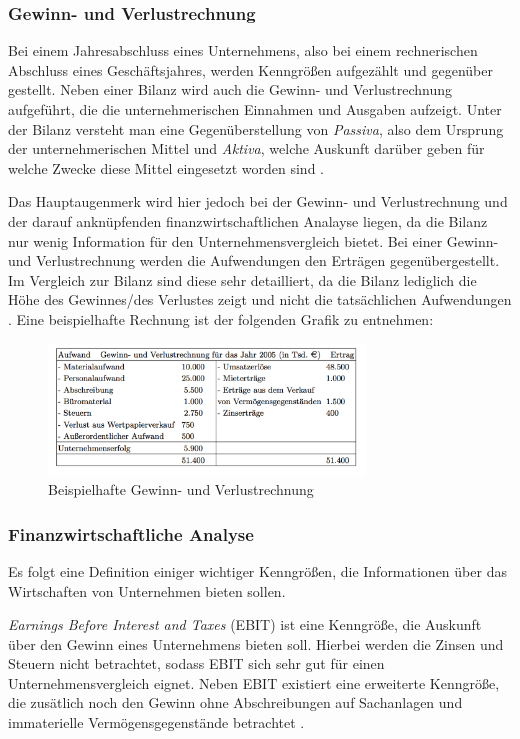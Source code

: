 \subsubsection{Gewinn- und Verlustrechnung}

Bei einem Jahresabschluss eines Unternehmens, also bei einem rechnerischen Abschluss eines Geschäftsjahres, werden Kenngrößen aufgezählt und gegenüber gestellt. Neben einer Bilanz wird auch die Gewinn- und Verlustrechnung aufgeführt, die die unternehmerischen Einnahmen und Ausgaben aufzeigt. Unter der Bilanz versteht man eine Gegenüberstellung von \textit{Passiva}, also dem Ursprung der unternehmerischen Mittel und \textit{Aktiva}, welche Auskunft darüber geben für welche Zwecke diese Mittel eingesetzt worden sind \cite{muller}. 

Das Hauptaugenmerk wird hier jedoch bei der Gewinn- und Verlustrechnung und der darauf anknüpfenden finanzwirtschaftlichen Analayse liegen, da die Bilanz nur wenig Information für den Unternehmensvergleich bietet. Bei einer Gewinn- und Verlustrechnung werden die Aufwendungen den Erträgen gegenübergestellt. Im Vergleich zur Bilanz sind diese sehr detailliert, da die Bilanz lediglich die Höhe des Gewinnes/des Verlustes zeigt und nicht die tatsächlichen Aufwendungen \cite{muller}. Eine beispielhafte Rechnung ist der folgenden Grafik zu entnehmen:


\begin{figure}[H]
\centering
\includegraphics[width=0.75\textwidth]{pictures/guv.png}
\caption{Beispielhafte Gewinn- und Verlustrechnung}
\label{fig:guv}
\end{figure}

\subsubsection{Finanzwirtschaftliche Analyse}

Es folgt eine Definition einiger wichtiger Kenngrößen, die Informationen über das Wirtschaften von Unternehmen bieten sollen. 

\textit{Earnings Before Interest and Taxes} (EBIT) ist eine Kenngröße, die Auskunft über den Gewinn eines Unternehmens bieten soll. Hierbei werden die Zinsen und Steuern nicht betrachtet, sodass EBIT sich sehr gut für einen Unternehmensvergleich eignet. Neben EBIT existiert eine erweiterte Kenngröße, die zusätlich noch den Gewinn ohne Abschreibungen auf Sachanlagen und immaterielle Vermögensgegenstände betrachtet \cite{bwlformeln}.

